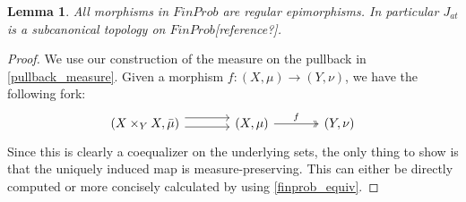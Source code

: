 \documentclass[a4paper]{amsproc}
\theoremstyle{plain}
\newtheorem{theorem}{Theorem}[section]
\newtheorem{lemma}[theorem]{Lemma}
\theoremstyle{definition}
\theoremstyle{remark}
\numberwithin{equation}{section}
\begin{document}
\begin{lemma}\label{subcanonical} All morphisms in $FinProb$ are regular epimorphisms. In particular $J_{at}$ is a subcanonical topology on $FinProb$[reference?].
\end{lemma}
\begin{proof}
We use our construction of the measure on the pullback in \ref{pullback_measure}. Given a morphism $f:(X,\mu)\rightarrow (Y, \nu)$, we have the following fork:
\[
\begin{tikzcd}[column sep=large]
(X \times_Y X, \bar{\mu}) \arrow[r, shift left=2] \arrow[r, shift right] & (X,\mu) \arrow[r, "f", two heads] & (Y,\nu)
\end{tikzcd}
\]
Since this is clearly a coequalizer on the underlying sets, the only thing to show is that the uniquely induced map is measure-preserving. This can either be directly computed or more concisely calculated by using \ref{finprob_equiv}.
\end{proof}
\end{document}
